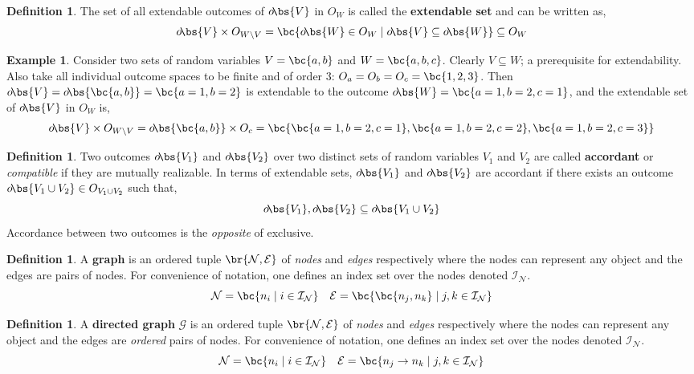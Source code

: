 \documentclass[aps, 10pt, english, twoside, pra, nofootinbib, longbibliography]{revtex4-1}
\theoremstyle{plain}
\theoremstyle{definition}
\newtheorem{definition}[theorem]{Definition}
\newtheorem{example}[theorem]{Example}
\theoremstyle{remark}
\newcommand{\graph}{\mathcal{G}}
\newcommand{\nodes}{\mathcal{N}}
\newcommand{\edges}{\mathcal{E}}
\newcommand{\ind}{\mathcal{I}}
\newcommand{\term}[1]{\textcolor{Mahogany}{\textbf{#1}}}
\newcommand{\outc}[1]{o\!\bs{#1}}
\begin{document}
    \begin{definition}
        The set of all extendable outcomes of $\outc{V}$ in $O_{W}$ is called the \term{extendable set} and can be written as,
        \[ \outc{V} \times O_{W\setminus V} = \bc{\outc{W} \in O_{W} \mid \outc{V} \subseteq \outc{W}} \subseteq O_{W} \]
    \end{definition}

    \begin{example}
        Consider two sets of random variables $V = \bc{a, b}$ and $W = \bc{a, b, c}$. Clearly $V \subseteq W$; a prerequisite for extendability. Also take all individual outcome spaces to be finite and of order 3: $O_a = O_b = O_c = \bc{1,2,3}$. Then $\outc{V} = \outc{\bc{a,b}} = \bc{a = 1, b = 2}$ is extendable to the outcome $\outc{W} = \bc{a = 1, b = 2, c = 1}$, and the extendable set of $\outc{V}$ in $O_{W}$ is,
        \[ \outc{V} \times O_{W\setminus V} = \outc{\bc{a,b}} \times O_c = \bc{\bc{a = 1, b = 2, c = 1}, \bc{a = 1, b = 2, c = 2}, \bc{a = 1, b = 2, c = 3}} \]
    \end{example}

    \begin{definition}
        Two outcomes $\outc{V_1}$ and $\outc{V_2}$ over two distinct sets of random variables $V_1$ and $V_2$ are called \term{accordant} or \textit{compatible} if they are mutually realizable. In terms of extendable sets, $\outc{V_1}$ and $\outc{V_2}$ are accordant if there exists an outcome $\outc{V_1 \cup V_2} \in O_{V_1 \cup V_2}$ such that,
        \[ \outc{V_1}, \outc{V_2} \subseteq \outc{V_1 \cup V_2}  \]
        Accordance between two outcomes is the \textit{opposite} of exclusive.
    \end{definition}

    \begin{definition}
        \label{def:graph}
        A \term{graph} is an ordered tuple $\br{\nodes, \edges}$ of \textit{nodes} and \textit{edges} respectively where the nodes can represent any object and the edges are pairs of nodes. For convenience of notation, one defines an index set over the nodes denoted $\ind_\nodes$.
        \[ \nodes = \bc{n_i \mid i \in \ind_\nodes} \quad \edges = \bc{\bc{n_j, n_k} \mid j,k \in \ind_\nodes} \]
    \end{definition}

    \begin{definition}
        \label{def:directed_graph}
        A \term{directed graph} $\graph$ is an ordered tuple $\br{\nodes, \edges}$ of \textit{nodes} and \textit{edges} respectively where the nodes can represent any object and the edges are \textit{ordered} pairs of nodes. For convenience of notation, one defines an index set over the nodes denoted $\ind_\nodes$.
        \[ \nodes = \bc{n_i \mid i \in \ind_\nodes} \quad \edges = \bc{n_j \to n_k \mid j,k \in \ind_\nodes} \]
    \end{definition}
\end{document}

